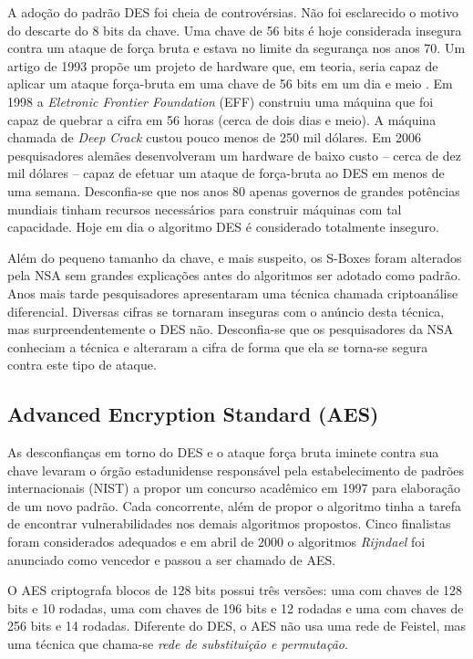 A adoção do padrão DES foi cheia de controvérsias.
Não foi esclarecido o motivo do descarte do 8 bits da chave.
Uma chave de 56 bits é hoje considerada insegura contra um ataque de força bruta e estava no limite da segurança nos anos 70.
Um artigo de 1993 propõe um projeto de hardware que, em teoria, seria capaz de aplicar um ataque força-bruta em uma chave de 56 bits em um dia e meio \cite{}.
Em 1998 a {\em Eletronic Frontier Foundation} (EFF) construiu uma máquina que foi capaz de quebrar a cifra em 56 horas (cerca de dois dias e meio).
A máquina chamada de {\em Deep Crack} custou pouco menos de 250 mil dólares.
Em 2006 pesquisadores alemães desenvolveram um hardware de baixo custo -- cerca de dez mil dólares -- capaz de efetuar um ataque de força-bruta ao DES em menos de uma semana.
Desconfia-se que nos anos 80 apenas governos de grandes potências mundiais tinham recursos necessários para construir máquinas com tal capacidade.
Hoje em dia o algoritmo DES é considerado totalmente inseguro.


Além do pequeno tamanho da chave, e mais suspeito, os S-Boxes foram alterados pela NSA sem grandes explicações antes do algoritmos ser adotado como padrão.
Anos mais tarde pesquisadores apresentaram uma técnica chamada criptoanálise diferencial.
Diversas cifras se tornaram inseguras com o anúncio desta técnica, mas surpreendentemente o DES não.
Desconfia-se que os pesquisadores da NSA conheciam a técnica e alteraram a cifra de forma que ela se torna-se segura contra este tipo de ataque.

\subsection{Advanced Encryption Standard (AES)}
\label{sec:aes}

As desconfianças em torno do DES e o ataque força bruta iminete contra sua chave levaram o órgão estadunidense responsável pela estabelecimento de padrões internacionais (NIST) a propor um concurso acadêmico em 1997 para elaboração de um novo padrão.
Cada concorrente, além de propor o algoritmo tinha a tarefa de encontrar vulnerabilidades nos demais algoritmos propostos.
Cinco finalistas foram considerados adequados e em abril de 2000 o algoritmos {\em Rijndael} foi anunciado como vencedor e passou a ser chamado de AES.

O AES criptografa blocos de 128 bits possui três versões: uma com chaves de 128 bits e 10 rodadas, uma com chaves de 196 bits e 12 rodadas e uma com chaves de 256 bits e 14 rodadas.
Diferente do DES, o AES não usa uma rede de Feistel, mas uma técnica que chama-se {\em rede de substituição e permutação}.

